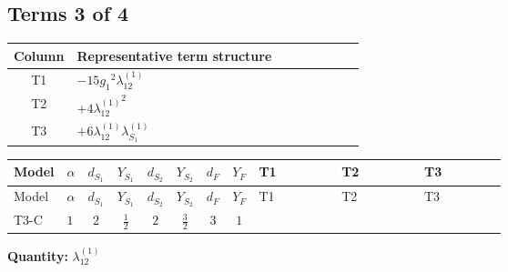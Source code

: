 \documentclass[8pt]{article}
\begin{document}
\begin{landscape}
\subsection*{Terms 3 of 4}
\begin{center}
\begin{tabular}{@{}c >{\raggedright\arraybackslash}p{0.82\linewidth}@{}}
\toprule
Column & Representative term structure \\
\midrule
T1 & \(\displaystyle -15 {g_1}^2 {\lambda_{12}^{(1)}}\) \\
\midrule
T2 & \(\displaystyle +4 {\lambda_{12}^{(1)}}^2\) \\
\midrule
T3 & \(\displaystyle +6 {\lambda_{12}^{(1)}} {\lambda_{S_1}^{(1)}}\) \\
\midrule
\bottomrule
\end{tabular}
\end{center}
\smallskip
\tiny
\begin{longtable}{@{}llcccccc >{\raggedright\arraybackslash}p{0.21\linewidth} >{\raggedright\arraybackslash}p{0.21\linewidth} >{\raggedright\arraybackslash}p{0.21\linewidth}@{}}
\toprule
Model & $\alpha$ & $d_{S_1}$ & $Y_{S_1}$ & $d_{S_2}$ & $Y_{S_2}$ & $d_F$ & $Y_F$ & T1 & T2 & T3 \\
\midrule
\endfirsthead
\toprule
Model & $\alpha$ & $d_{S_1}$ & $Y_{S_1}$ & $d_{S_2}$ & $Y_{S_2}$ & $d_F$ & $Y_F$ & T1 & T2 & T3 \\
\midrule
\endhead
T3-C & $1$ & $2$ & $\frac{1}{2}$ & $2$ & $\frac{3}{2}$ & $3$ & $1$ & \scriptsize\adjustbox{max width=\linewidth}{$\begin{gathered} -15 {g_1}^2 {\lambda_{12}^{(1)}}\end{gathered}$} & \scriptsize\adjustbox{max width=\linewidth}{$\begin{gathered} +4 {\lambda_{12}^{(1)}}^2\end{gathered}$} & \scriptsize\adjustbox{max width=\linewidth}{$\begin{gathered} +6 {\lambda_{12}^{(1)}} {\lambda_{S_1}^{(1)}}\end{gathered}$} \\
\midrule
\bottomrule
\end{longtable}
\clearpage
\noindent\textbf{Quantity: }$\lambda_{12}^{(1)}$\par\smallskip

\end{landscape}
\end{document}

